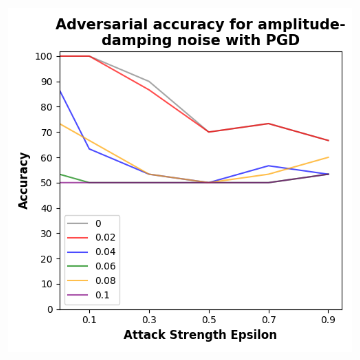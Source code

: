 \begin{figure}[!h]
\begin{subfigure}{0.45\textwidth}
      \includegraphics[width=\linewidth]{figures/evaluation_results/iris/pqc/figures/amplitude-damping-pgd.png}
      \label{fig:iris6}
  \end{subfigure}


\end{figure}
